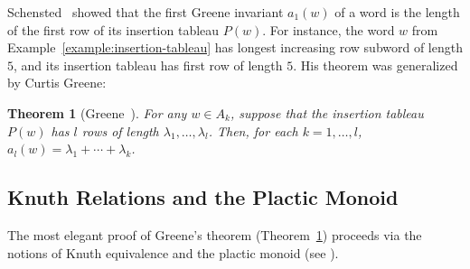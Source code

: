 \documentclass[12pt]{amsart}
\newtheorem{theorem}{Theorem}[subsection]
\theoremstyle{definition}
\begin{document}
Schensted~\cite{schensted} showed that the first Greene invariant $a_1(w)$ of a word is the length of the first row of its insertion tableau $P(w)$.
For instance, the word $w$ from Example~\ref{example:insertion-tableau} has longest increasing row subword of length $5$, and its insertion tableau has first row of length $5$.
His theorem was generalized by Curtis Greene:
\begin{theorem}
  [Greene~\cite{Greene-schen}]
  \label{theorem:Greene}
  For any $w\in A_k$, suppose that the insertion tableau $P(w)$ has $l$ rows of length $\lambda_1,\dotsc,\lambda_l$.
  Then, for each $k=1,\dotsc,l$, $a_l(w)=\lambda_1+\dotsb + \lambda_k$.
\end{theorem}
\subsection{Knuth Relations and the Plactic Monoid}
\label{sec:knuth-equivalence}
The most elegant proof of Greene's theorem (Theorem~\ref{theorem:Greene}) proceeds via the notions of Knuth equivalence and the plactic monoid (see \cite{Lascoux}).
\end{document}
